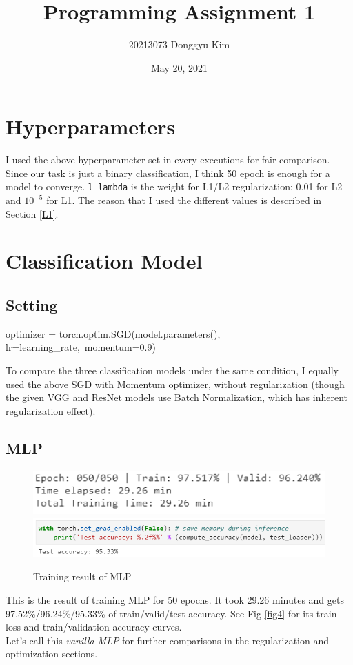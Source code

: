 \documentclass[11pt]{article}
\title{Programming Assignment 1}
\author{20213073 Donggyu Kim}
\date{May 20, 2021}
\begin{document}
\maketitle
\thispagestyle{fancy}

\setcounter{section}{-1}
\section{Hyperparameters}
    I used the above hyperparameter set in every executions for fair comparison. Since our task is just a binary classification, I think 50 epoch is enough for a model to converge. \texttt{l\_lambda} is the weight for L1/L2 regularization: 0.01 for L2 and $10^{-5}$ for L1. The reason that I used the different values is described in Section \ref{L1}.

\section{Classification Model}
\setcounter{subsection}{-1}
\subsection{Setting}
\begin{pythoncode*}{}
optimizer = torch.optim.SGD(model.parameters(), lr=learning_rate,\
                                                momentum=0.9)
\end{pythoncode*}
    To compare the three classification models under the same condition, I equally used the above SGD with Momentum optimizer, without regularization (though the given VGG and ResNet models use Batch Normalization, which has inherent regularization effect).

\subsection{MLP}\label{vanilla}
    \begin{figure}[H]
        \includegraphics[width=0.8\linewidth]{img/MLP/final.PNG}
        \includegraphics[width=1\linewidth]{img/MLP/test.PNG}
        \caption{Training result of MLP}
        \label{fig1}
    \end{figure}
    This is the result of training MLP for 50 epochs. It took 29.26 minutes and gets 97.52\%/96.24\%/95.33\% of train/valid/test accuracy. See Fig \ref{fig4} for its train loss and train/validation accuracy curves.\\
    Let's call this \textit{vanilla MLP} for further comparisons in the regularization and optimization sections.
\end{document}
